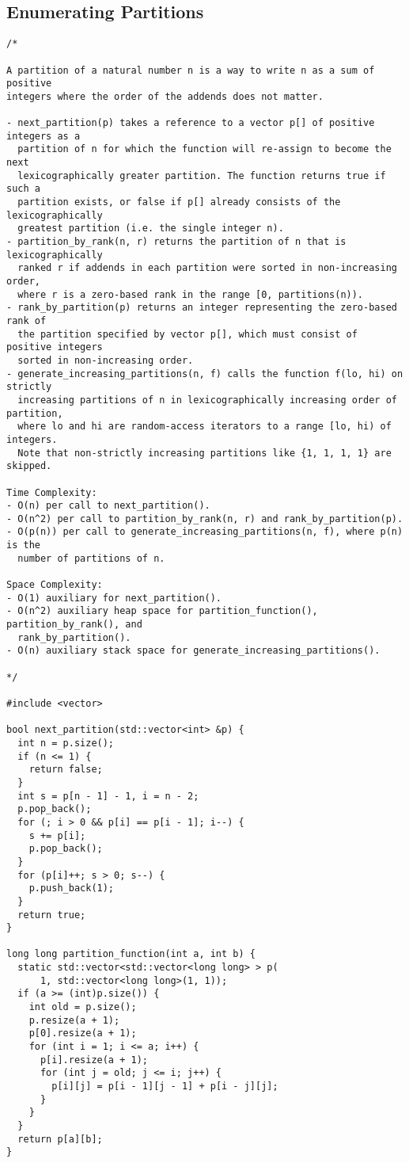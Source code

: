 \subsection{Enumerating Partitions}
\begin{lstlisting}
/*

A partition of a natural number n is a way to write n as a sum of positive
integers where the order of the addends does not matter.

- next_partition(p) takes a reference to a vector p[] of positive integers as a
  partition of n for which the function will re-assign to become the next
  lexicographically greater partition. The function returns true if such a
  partition exists, or false if p[] already consists of the lexicographically
  greatest partition (i.e. the single integer n).
- partition_by_rank(n, r) returns the partition of n that is lexicographically
  ranked r if addends in each partition were sorted in non-increasing order,
  where r is a zero-based rank in the range [0, partitions(n)).
- rank_by_partition(p) returns an integer representing the zero-based rank of
  the partition specified by vector p[], which must consist of positive integers
  sorted in non-increasing order.
- generate_increasing_partitions(n, f) calls the function f(lo, hi) on strictly
  increasing partitions of n in lexicographically increasing order of partition,
  where lo and hi are random-access iterators to a range [lo, hi) of integers.
  Note that non-strictly increasing partitions like {1, 1, 1, 1} are skipped.

Time Complexity:
- O(n) per call to next_partition().
- O(n^2) per call to partition_by_rank(n, r) and rank_by_partition(p).
- O(p(n)) per call to generate_increasing_partitions(n, f), where p(n) is the
  number of partitions of n.

Space Complexity:
- O(1) auxiliary for next_partition().
- O(n^2) auxiliary heap space for partition_function(), partition_by_rank(), and
  rank_by_partition().
- O(n) auxiliary stack space for generate_increasing_partitions().

*/

#include <vector>

bool next_partition(std::vector<int> &p) {
  int n = p.size();
  if (n <= 1) {
    return false;
  }
  int s = p[n - 1] - 1, i = n - 2;
  p.pop_back();
  for (; i > 0 && p[i] == p[i - 1]; i--) {
    s += p[i];
    p.pop_back();
  }
  for (p[i]++; s > 0; s--) {
    p.push_back(1);
  }
  return true;
}

long long partition_function(int a, int b) {
  static std::vector<std::vector<long long> > p(
      1, std::vector<long long>(1, 1));
  if (a >= (int)p.size()) {
    int old = p.size();
    p.resize(a + 1);
    p[0].resize(a + 1);
    for (int i = 1; i <= a; i++) {
      p[i].resize(a + 1);
      for (int j = old; j <= i; j++) {
        p[i][j] = p[i - 1][j - 1] + p[i - j][j];
      }
    }
  }
  return p[a][b];
}


\end{lstlisting}
